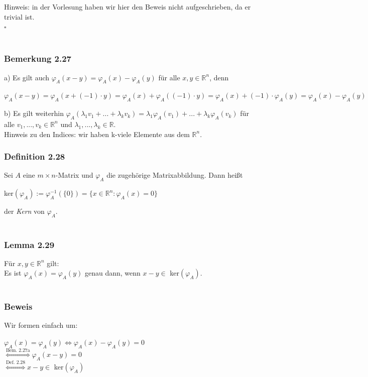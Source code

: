 \documentclass{article}
\begin{document}
Hinweis: in der Vorlesung haben wir hier den Beweis nicht aufgeschrieben, da er trivial ist. \\
$\square$ \\
\\
\subsubsection*{Bemerkung 2.27}
a) Es gilt auch $\varphi_A(x-y) = \varphi_A(x) - \varphi_A(y)$ für alle $x,y \in \mathbb{R}^n$, denn 
\begin{center}
    $\varphi_A(x-y) = \varphi_A(x + (-1)\cdot y) = \varphi_A(x) + \varphi_A((-1)\cdot y) = \varphi_A(x) + (-1) \cdot \varphi_A(y) = \varphi_A(x) - \varphi_A(y)$
\end{center}
b) Es gilt weiterhin $\varphi_A(\lambda_1 v_1 + ... + \lambda_k v_k) = \lambda_1 \varphi_A(v_1) + ... + \lambda_k \varphi_A(v_k)$ für alle $v_1, ..., v_k \in \mathbb{R}^n$ und $\lambda_1, ..., \lambda_k \in \mathbb{R}$. \\
Hinweis zu den Indices: wir haben k-viele Elemente aus dem $\mathbb{R}^n$.
\\
\subsubsection*{Definition 2.28}
Sei $A$ eine $m \times n$-Matrix und $\varphi_A$ die zugehörige Matrixabbildung. Dann heißt \\
\begin{center}
    ker$(\varphi_A) := \varphi_A^{-1}(\{0\}) = \{x \in \mathbb{R}^n: \varphi_A(x) = 0\}$
\end{center}
der \textit{Kern} von $\varphi_A$. \\
\\
\subsubsection*{Lemma 2.29}
Für $x,y \in \mathbb{R}^n$ gilt: \\
Es ist $\varphi_A(x) = \varphi_A(y)$ genau dann, wenn $x-y \in$ ker$(\varphi_A)$. \\
\\
\subsubsection*{Beweis}
Wir formen einfach um: \\
\begin{center}
    $\varphi_A(x) = \varphi_A(y) \Leftrightarrow \varphi_A(x) - \varphi_A(y) = 0$ \\
    $\overset{\text{Bem. 2.27a}}{\Leftrightarrow} \varphi_A(x-y) = 0$ \\
    $\overset{\text{Def. 2.28}}{\Leftrightarrow} x-y \in$ ker$(\varphi_A)$
\end{center}
\end{document}
